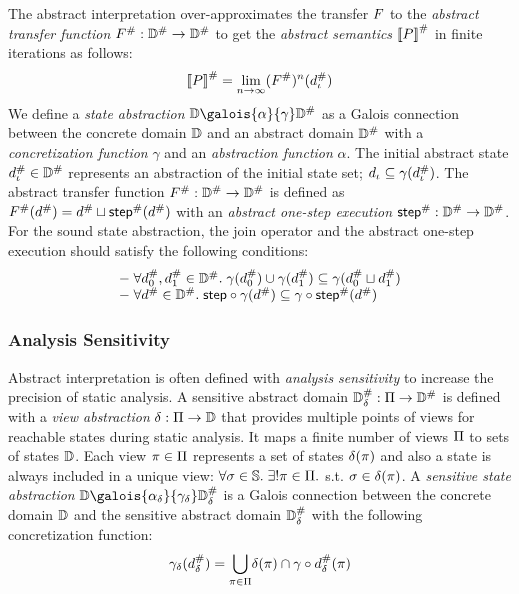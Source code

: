 The abstract interpretation over-approximates the transfer $F$ to the
\textit{abstract transfer function} ${F}^{\#}: {\mathbb{D}}^{\#} \rightarrow {\mathbb{D}}^{\#}$
to get the \textit{abstract semantics} ${\llbracket P \rrbracket}^{\#}$ in finite iterations as
follows:
\[
    {\llbracket P \rrbracket}^{\#} = \underset{n \rightarrow
    \infty}{\lim}{({F}^{\#})^n({d}^{\#}_\iota)}\\
\]
We define a \textit{state abstraction} $\dom \galois{\alpha}{\gamma} \absdom$ as
a Galois connection between the concrete domain $\mathbb{D}$ and an abstract domain
${\mathbb{D}}^{\#}$ with a \textit{concretization function} $\gamma$ and an
\textit{abstraction function} $\alpha$.  The initial abstract state ${d}^{\#}_\iota
\in {\mathbb{D}}^{\#}$ represents an abstraction of the initial state set; $d_\iota
\subseteq \gamma({d}^{\#}_\iota)$.  The abstract transfer function ${F}^{\#}:
{\mathbb{D}}^{\#} \rightarrow {\mathbb{D}}^{\#}$ is defined as ${F}^{\#}({d}^{\#}) = {d}^{\#}
\sqcup {\textsf{step}}^{\#}({d}^{\#})$ with an \textit{abstract one-step execution}
${\textsf{step}}^{\#}: {\mathbb{D}}^{\#} \rightarrow {\mathbb{D}}^{\#}$.  For the sound state abstraction, the
join operator and the abstract one-step execution should satisfy the following
conditions:
\begin{equation}\label{equ:sound}
  \begin{array}{l}
  - \; \forall {d}^{\#}_0, {d}^{\#}_1 \in {\mathbb{D}}^{\#}. \; \gamma({d}^{\#}_0) \cup
    \gamma({d}^{\#}_1) \subseteq \gamma({d}^{\#}_0 \sqcup {d}^{\#}_1)\\
  - \; \forall {d}^{\#} \in {\mathbb{D}}^{\#}. \; \textsf{step} \circ \gamma({d}^{\#}) \subseteq
    \gamma \circ {\textsf{step}}^{\#}({d}^{\#})\\
  \end{array}
\end{equation}


\subsubsection{Analysis Sensitivity}

Abstract interpretation is often defined with \textit{analysis sensitivity} to
increase the precision of static analysis.  A sensitive abstract domain
${\mathbb{D}}^{\#}_\delta: \Pi \rightarrow {\mathbb{D}}^{\#}$ is defined with a \textit{view
abstraction} $\delta: \Pi \rightarrow \mathbb{D}$ that provides multiple points
of views for reachable states during static analysis.  It maps a finite number
of views $\Pi$ to sets of states $\mathbb{D}$. Each view $\pi \in \Pi$
represents a set of states $\delta(\pi)$ and also a state is always
included in a unique view: $\forall \sigma \in \mathbb{S}. \; \exists! \pi \in
\Pi.$ s.t. $\sigma \in \delta(\pi)$.  A \textit{sensitive state
abstraction} $\dom \galois{\alpha_\viewmap}{\sgamma} \sabsdom$ is a Galois
connection between the concrete domain $\mathbb{D}$ and the sensitive abstract domain
${\mathbb{D}}^{\#}_\delta$ with the following concretization function:
\[
  \gamma_\delta({{d}^{\#}_\delta}) = \underset{\pi \in \Pi}{\bigcup}
  {\delta(\pi) \cap \gamma \circ {{d}^{\#}_\delta}(\pi)}
\]

